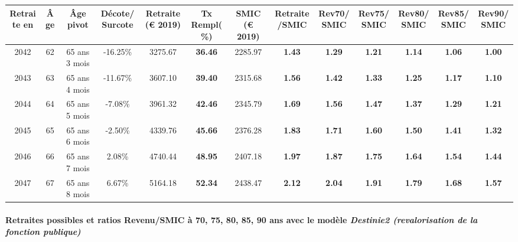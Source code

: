 { \scriptsize \begin{center} 
\begin{tabular}[htb]{|c|c||c|c||c|c||c||c|c|c|c|c|c|} 
\hline 
 Retraite en &  Âge &  Âge pivot &  Décote/Surcote &  Retraite (\euro{} 2019) &  Tx Rempl(\%) &  SMIC (\euro{} 2019) &  Retraite/SMIC &  Rev70/SMIC &  Rev75/SMIC &  Rev80/SMIC &  Rev85/SMIC &  Rev90/SMIC \\ 
\hline \hline 
 2042 &  62 &  65 ans 3 mois &  -16.25\% &  3275.67 &  {\bf 36.46} &  2285.97 &  {\bf 1.43} &  {\bf 1.29} &  {\bf 1.21} &  {\bf 1.14} &  {\bf 1.06} &  {\bf {\color{red} 1.00}} \\ 
\hline 
 2043 &  63 &  65 ans 4 mois &  -11.67\% &  3607.10 &  {\bf 39.40} &  2315.68 &  {\bf 1.56} &  {\bf 1.42} &  {\bf 1.33} &  {\bf 1.25} &  {\bf 1.17} &  {\bf 1.10} \\ 
\hline 
 2044 &  64 &  65 ans 5 mois &  -7.08\% &  3961.32 &  {\bf 42.46} &  2345.79 &  {\bf 1.69} &  {\bf 1.56} &  {\bf 1.47} &  {\bf 1.37} &  {\bf 1.29} &  {\bf 1.21} \\ 
\hline 
 2045 &  65 &  65 ans 6 mois &  -2.50\% &  4339.76 &  {\bf 45.66} &  2376.28 &  {\bf 1.83} &  {\bf 1.71} &  {\bf 1.60} &  {\bf 1.50} &  {\bf 1.41} &  {\bf 1.32} \\ 
\hline 
 2046 &  66 &  65 ans 7 mois &  2.08\% &  4740.44 &  {\bf 48.95} &  2407.18 &  {\bf 1.97} &  {\bf 1.87} &  {\bf 1.75} &  {\bf 1.64} &  {\bf 1.54} &  {\bf 1.44} \\ 
\hline 
 2047 &  67 &  65 ans 8 mois &  6.67\% &  5164.18 &  {\bf 52.34} &  2438.47 &  {\bf 2.12} &  {\bf 2.04} &  {\bf 1.91} &  {\bf 1.79} &  {\bf 1.68} &  {\bf 1.57} \\ 
\hline 
\hline 
\end{tabular} 
\end{center} } 
\paragraph{Retraites possibles et ratios Revenu/SMIC à 70, 75, 80, 85, 90 ans avec le modèle \emph{Destinie2 (revalorisation de la fonction publique)}}  
 
